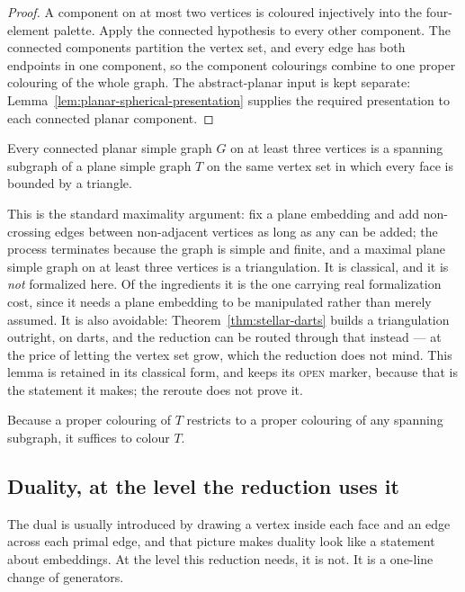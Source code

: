 \begin{proof}
A component on at most two vertices is coloured injectively into the
four-element palette.  Apply the connected hypothesis to every other
component.  The connected components partition the vertex set, and every
edge has both endpoints in one component, so the component colourings combine
to one proper colouring of the whole graph.  The abstract-planar input is
kept separate: Lemma~\ref{lem:planar-spherical-presentation} supplies the
required presentation to each connected planar component.
\end{proof}

\begin{lemma}[triangulation]\label{lem:triangulate}
\Sopen
Every connected planar simple graph $G$ on at least three vertices is a
spanning subgraph of a plane simple graph $T$ on the same vertex set in
which every face is bounded by a triangle.
\end{lemma}

This is the standard maximality argument: fix a plane embedding and add
non-crossing edges between non-adjacent vertices as long as any can be
added; the process terminates because the graph is simple and finite, and a
maximal plane simple graph on at least three vertices is a triangulation. It
is classical, and it is \emph{not} formalized here. Of the ingredients it is
the one carrying real formalization cost, since it needs a plane embedding
to be manipulated rather than merely assumed. It is also avoidable:
Theorem~\ref{thm:stellar-darts} builds a triangulation outright, on darts,
and the reduction can be routed through that instead --- at the price of
letting the vertex set grow, which the reduction does not mind. This lemma
is retained in its classical form, and keeps its \textsc{open} marker,
because that is the statement it makes; the reroute does not prove it.

Because a proper colouring of $T$ restricts to a proper colouring of any
spanning subgraph, it suffices to colour $T$.

\subsection{Duality, at the level the reduction uses it}

The dual is usually introduced by drawing a vertex inside each face and an
edge across each primal edge, and that picture makes duality look like a
statement about embeddings. At the level this reduction needs, it is not.
It is a one-line change of generators.

